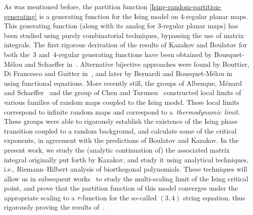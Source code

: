 \documentclass[10pt,a4paper]{amsart}
\numberwithin{equation}{section}
\begin{document}
As was mentioned before, the partition function \eqref{Ising-random-partition-generating} is a generating function for the Ising model on $4$-regular planar maps. This
generating function (along with its analog for $3$-regular planar maps) has been studied using purely combinatorial techniques, bypassing the use of
matrix integrals. The first rigorous derivation of the results of Kazakov and Boulatov for
both the~$3$ and~$4$-regular generating functions have been obtained by Bousquet-M\'{e}lou and Schaeffer in~\cite{MelouSchaeffer}. Alternative bijective approaches were found by Bouttier, Di Francesco and Guitter in~\cite{BFG,BDFG}, and later by Bernardi and Bousquet-M\'{e}lou in~\cite{BBM} using functional equations. More recently still, the groups of Albenque, M\'{e}nard and Schaeffer~\cite{AM22, AMS} and the group of
Chen and Turunen~\cite{CT1,CT2,Tur} constructed local limits of various families of random maps coupled to the Ising model. These local limits correspond to infinite random maps and correspond to a~\textit{thermodynamic limit}. These groups were able to rigorously establish the existence of
the Ising phase transition coupled to a random background, and calculate some of the critical exponents, in agreement with the predictions of Boulatov and Kazakov. In the present work, we study the (analytic continuation of) the associated matrix integral originally put forth by Kazakov, and study it using analytical techniques, i.e., Riemann--Hilbert analysis of biorthogonal polynomials. These techniques will allow us in subsequent works~\cite{DHL3, DHL2} to study the multi-scaling limit of the Ising critical point, and prove that the partition function of this model converges under the appropriate scaling to a $\tau$-function for the so-called $(3,4)$ string equation, thus rigorously proving the results of~\cite{Kazakov3,CGM}.
\end{document}
